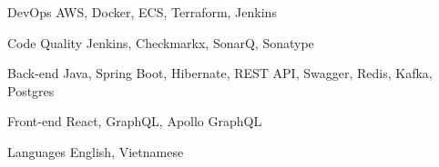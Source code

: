 

\begin{cvskills}

  \cvskill
    {DevOps} %
    {AWS, Docker, ECS, Terraform, Jenkins} %
    
  \cvskill
    {Code Quality} %
    {Jenkins, Checkmarkx, SonarQ, Sonatype} %

  \cvskill
    {Back-end} %
    {Java, Spring Boot, Hibernate, REST API, Swagger, Redis, Kafka, Postgres} %

  \cvskill
    {Front-end} %
    {React, GraphQL, Apollo GraphQL } %


  \cvskill
    {Languages} %
    {English, Vietnamese} %

\end{cvskills}
